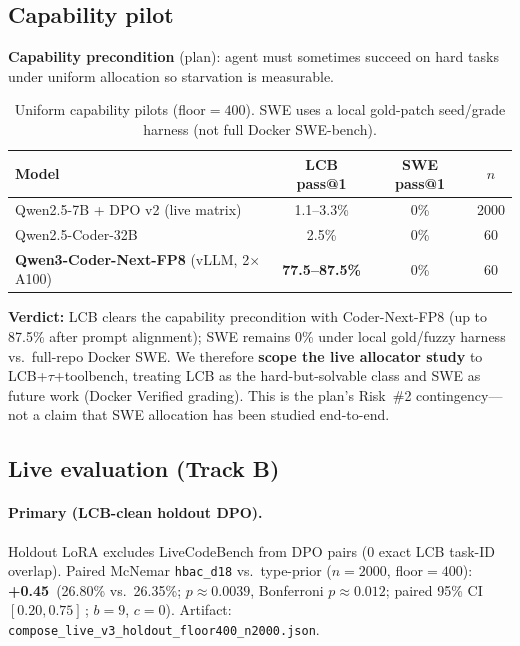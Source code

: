 \documentclass[11pt,letterpaper]{article}
\makeatletter
\newcommand{\passat}[1]{pass@#1}
\newcommand{\pp}{\,\text{pp}}
\makeatother
\begin{document}
\subsection{Capability pilot}
\label{sec:capability}

\textbf{Capability precondition} (plan): agent must sometimes succeed on hard tasks under uniform allocation so starvation is measurable.

\begin{table}[t]
\centering
\caption{Uniform capability pilots (floor${=}400$). SWE uses a local gold-patch seed/grade harness (not full Docker SWE-bench).}
\label{tab:capability}
\small
\begin{tabular}{lccc}
\toprule
Model & LCB \passat{1} & SWE \passat{1} & $n$ \\
\midrule
Qwen2.5-7B + DPO v2 (live matrix) & 1.1--3.3\% & 0\% & 2000 \\
Qwen2.5-Coder-32B & 2.5\% & 0\% & 60 \\
\textbf{Qwen3-Coder-Next-FP8} (vLLM, 2$\times$A100) & \textbf{77.5--87.5\%} & 0\% & 60 \\
\bottomrule
\end{tabular}
\end{table}

\textbf{Verdict:} LCB clears the capability precondition with Coder-Next-FP8 (up to 87.5\% after prompt alignment); SWE remains 0\% under local gold/fuzzy harness vs.\ full-repo Docker SWE.
We therefore \textbf{scope the live allocator study} to LCB+$\tau$+toolbench, treating LCB as the hard-but-solvable class and SWE as future work (Docker Verified grading).
This is the plan's Risk~\#2 contingency---not a claim that SWE allocation has been studied end-to-end.

\subsection{Live evaluation (Track B)}
\label{sec:live-v3}

\paragraph{Primary (LCB-clean holdout DPO).}
Holdout LoRA excludes LiveCodeBench from DPO pairs (0 exact LCB task-ID overlap).
Paired McNemar \texttt{hbac\_d18} vs.\ type-prior ($n{=}2000$, floor${=}400$): \textbf{+0.45\pp} (26.80\% vs.\ 26.35\%; $p{\approx}0.0039$, Bonferroni $p{\approx}0.012$; paired 95\% CI $[0.20,0.75]$\pp; $b{=}9$, $c{=}0$).
Artifact: \texttt{compose\_live\_v3\_holdout\_floor400\_n2000.json}.
\end{document}

